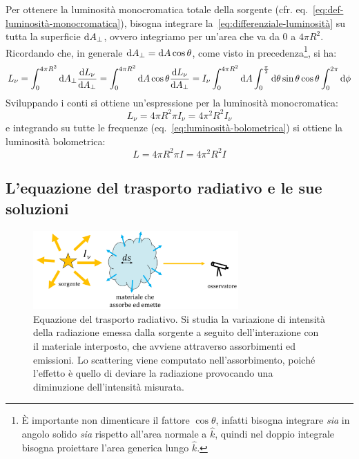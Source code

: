Per ottenere la luminosità monocromatica totale della sorgente (cfr. eq.~\eqref{eq:def-luminosità-monocromatica}), bisogna integrare la~\eqref{eq:differenziale-luminosità} su tutta la superficie $\mathop{\mathrm{{}d}}\mathopen{} A_\perp$, ovvero integriamo per un'area che va da $0$ a $4\pi R^2$. Ricordando che, in generale $\mathop{\mathrm{{}d}}\mathopen{} A_\perp = \mathop{\mathrm{{}d}}\mathopen{} A \cos{\theta}$, come visto in precedenza\footnote{È importante non dimenticare il fattore $\cos{\theta}$, infatti bisogna integrare \emph{sia} in angolo solido \emph{sia} rispetto all'area normale a $\hat{k}$, quindi nel doppio integrale bisogna proiettare l'area generica lungo $\hat{k}$.}, si ha:
\[
    L_\nu = \int_{0}^{4\pi R^2} \mathop{\mathrm{{}d}}\mathopen{} A_\perp \frac{\mathop{\mathrm{{}d}}\mathopen{} L_\nu}{\mathop{\mathrm{{}d}}\mathopen{} A_\perp} = \int_{0}^{4\pi R^2} \mathop{\mathrm{{}d}}\mathopen{} A \cos{\theta} \frac{\mathop{\mathrm{{}d}}\mathopen{} L_\nu}{\mathop{\mathrm{{}d}}\mathopen{} A_\perp} = I_\nu \int_0^{4\pi R^2} \mathop{\mathrm{{}d}}\mathopen{} A  \int_0^{\frac{\pi}{2}} \mathop{\mathrm{{}d}}\mathopen{} \theta \sin{\theta} \cos{\theta} \int_0^{2\pi} \mathop{\mathrm{{}d}}\mathopen{} \phi
\]
Sviluppando i conti si ottiene un'espressione per la luminosità monocromatica:
\begin{equation}\label{eq:luminosità-monocromatica-intensità}
    L_\nu = 4 \pi R^2 \pi I_\nu = 4 {\pi}^2 R^2 I_\nu
\end{equation}
e integrando su tutte le frequenze (eq.~\eqref{eq:luminosità-bolometrica}) si ottiene la luminosità bolometrica:
\begin{equation}\label{eq:luminosità-intensità}
    L = 4 \pi R^2 \pi I = 4 {\pi}^2 R^2 I
\end{equation}

\subsection{L'equazione del trasporto radiativo e le sue soluzioni}\label{sec:trasporto-radiativo}\label{sec:soluzioni-trasporto-radiativo}

\begin{figure}
\centering
\includegraphics[width=0.7\textwidth]{immagini/trasporto-radiativo.png}
\caption{Equazione del trasporto radiativo. Si studia la variazione di intensità della radiazione emessa dalla sorgente a seguito dell'interazione con il materiale interposto, che avviene attraverso assorbimenti ed emissioni. Lo scattering viene computato nell'assorbimento, poiché l'effetto è quello di deviare la radiazione provocando una diminuzione dell'intensità misurata.}
\label{fig:trasporto-radiativo}
\end{figure}

